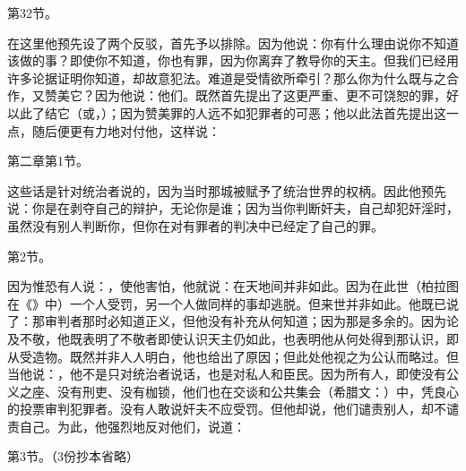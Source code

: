 第32节。\par

在这里他预先设了两个反驳，首先予以排除。因为他说：你有什么理由说你不知道该做的事？即使你不知道，你也有罪，因为你离弃了教导你的天主。但我们已经用许多论据证明你知道，却故意犯法。难道是受情欲所牵引？那么你为什么既与之合作，又赞美它？因为他说：他们。既然首先提出了这更严重、更不可饶恕的罪，好以此了结它（或，）；因为赞美罪的人远不如犯罪者的可恶；他以此法首先提出这一点，随后便更有力地对付他，这样说：\par

第二章第1节。\par

这些话是针对统治者说的，因为当时那城被赋予了统治世界的权柄。因此他预先说：你是在剥夺自己的辩护，无论你是谁；因为当你判断奸夫，自己却犯奸淫时，虽然没有别人判断你，但你在对有罪者的判决中已经定了自己的罪。\par

第2节。\par

因为惟恐有人说：，使他害怕，他就说：在天地间并非如此。因为在此世（柏拉图在《》中）一个人受罚，另一个人做同样的事却逃脱。但来世并非如此。他既已说了：那审判者那时必知道正义，但他没有补充从何知道；因为那是多余的。因为论及不敬，他既表明了不敬者即使认识天主仍如此，也表明他从何处得到那认识，即从受造物。既然并非人人明白，他也给出了原因；但此处他视之为公认而略过。但当他说：，他不是只对统治者说话，也是对私人和臣民。因为所有人，即使没有公义之座、没有刑吏、没有枷锁，他们也在交谈和公共集会（希腊文：）中，凭良心的投票审判犯罪者。没有人敢说奸夫不应受罚。但他却说，他们谴责别人，却不谴责自己。为此，他强烈地反对他们，说道：\par

第3节。（3份抄本省略）\par

